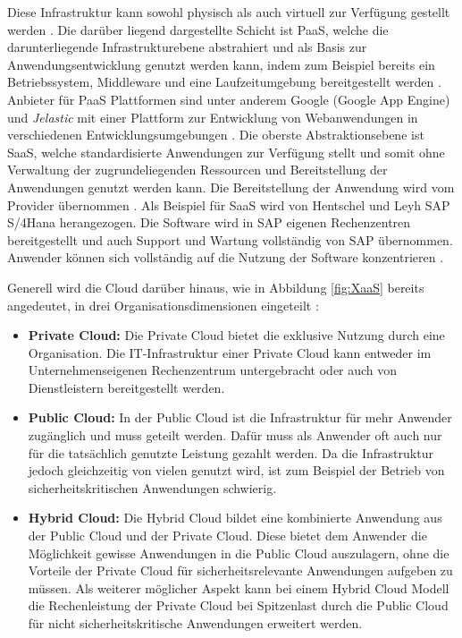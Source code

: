 Diese Infrastruktur kann sowohl physisch als auch virtuell zur Verfügung gestellt werden \cite[Vgl.][S. 9f]{Reinheimer2018}. Die darüber liegend dargestellte Schicht ist \ac{PaaS}, welche die darunterliegende Infrastrukturebene abstrahiert und als Basis zur Anwendungsentwicklung genutzt werden kann, indem zum Beispiel bereits ein Betriebssystem, Middleware und eine Laufzeitumgebung bereitgestellt werden \cite[Vgl.][S. 10]{Reinheimer2018}. Anbieter für \ac{PaaS} Plattformen sind unter anderem Google (Google App Engine) und \textit{Jelastic} mit einer Plattform zur Entwicklung von Webanwendungen in verschiedenen Entwicklungsumgebungen \cite[Vgl.][S. 13]{Reinheimer2018}. Die oberste Abstraktionsebene ist \ac{SaaS}, welche standardisierte Anwendungen zur Verfügung stellt und somit ohne Verwaltung der zugrundeliegenden Ressourcen und Bereitstellung der Anwendungen genutzt werden kann. Die Bereitstellung der Anwendung wird vom Provider übernommen \cite[Vgl.][S. 11]{Reinheimer2018}. Als Beispiel für \ac{SaaS} wird von Hentschel und Leyh SAP S/4Hana herangezogen. Die Software wird in SAP eigenen Rechenzentren bereitgestellt und auch Support und Wartung vollständig von SAP übernommen. Anwender können sich vollständig auf die Nutzung der Software konzentrieren \cite[Vgl.][S. 14]{Reinheimer2018}. \pagebreak

Generell wird die Cloud darüber hinaus, wie in Abbildung \ref{fig:XaaS} bereits angedeutet, in drei Organisationsdimensionen eingeteilt \cite[Vgl. auch im Folgenden][S. 7ff]{Reinheimer2018}:
\begin{itemize}
\item \textbf{Private Cloud:} Die Private Cloud bietet die exklusive Nutzung durch eine Organisation. Die IT-Infrastruktur einer Private Cloud kann entweder im Unternehmenseigenen Rechenzentrum untergebracht oder auch von Dienstleistern bereitgestellt werden.
\item \textbf{Public Cloud:} In der Public Cloud ist die Infrastruktur für mehr Anwender zugänglich und muss geteilt werden. Dafür muss als Anwender oft auch nur für die tatsächlich genutzte Leistung gezahlt werden. Da die Infrastruktur jedoch gleichzeitig von vielen genutzt wird, ist zum Beispiel der Betrieb von sicherheitskritischen Anwendungen schwierig.
\item \textbf{Hybrid Cloud:} Die Hybrid Cloud bildet eine kombinierte Anwendung aus der Public Cloud und der Private Cloud. Diese bietet dem Anwender die Möglichkeit gewisse Anwendungen in die Public Cloud auszulagern, ohne die Vorteile der Private Cloud für sicherheitsrelevante Anwendungen aufgeben zu müssen. Als weiterer möglicher Aspekt kann bei einem Hybrid Cloud Modell die Rechenleistung der Private Cloud bei Spitzenlast durch die Public Cloud für nicht sicherheitskritische Anwendungen erweitert werden. 
\end{itemize} \pagebreak

